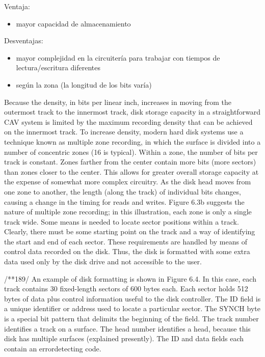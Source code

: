 Ventaja: 
\begin{itemize}
\item mayor capacidad de almacenamiento
\end{itemize}

Desventajas: 
\begin{itemize}
\item mayor complejidad en la circuitería para trabajar con tiempos de lectura/escritura diferentes
\item según la zona (la longitud de los bits varía)
\end{itemize}

Because the density, in bits per linear inch, increases in moving from the outermost
track to the innermost track, disk storage capacity in a straightforward CAV
system is limited by the maximum recording density that can be achieved on the
innermost track. To increase density, modern hard disk systems use a technique
known as multiple zone recording, in which the surface is divided into a number
of concentric zones (16 is typical). Within a zone, the number of bits per track is
constant. Zones farther from the center contain more bits (more sectors) than zones
closer to the center. This allows for greater overall storage capacity at the expense
of somewhat more complex circuitry. As the disk head moves from one zone to
another, the length (along the track) of individual bits changes, causing a change
in the timing for reads and writes. Figure 6.3b suggests the nature of multiple zone
recording; in this illustration, each zone is only a single track wide.
Some means is needed to locate sector positions within a track. Clearly, there
must be some starting point on the track and a way of identifying the start and end
of each sector. These requirements are handled by means of control data recorded
on the disk. Thus, the disk is formatted with some extra data used only by the disk
drive and not accessible to the user.

/**189/
An example of disk formatting is shown in Figure 6.4. In this case, each track
contains 30 fixed-length sectors of 600 bytes each. Each sector holds 512 bytes of
data plus control information useful to the disk controller. The ID field is a unique
identifier or address used to locate a particular sector. The SYNCH byte is a special
bit pattern that delimits the beginning of the field. The track number identifies a
track on a surface. The head number identifies a head, because this disk has multiple
surfaces (explained presently). The ID and data fields each contain an errordetecting
code.

